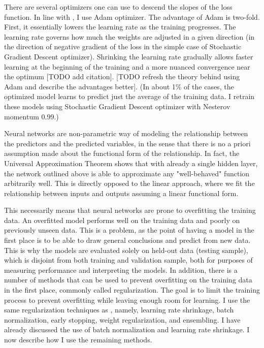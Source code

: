 	There are several optimizers one can use to descend the slopes of the loss function. In line with \cite{gu2020empirical}, I use Adam optimizer. The advantage of Adam is two-fold. First, it essentially lowers the learning rate as the training progresses. The learning rate governs how much the weights are adjusted in a given direction (in the direction of negative gradient of the loss in the simple case of Stochastic Gradient Descent optimizer). Shrinking the learning rate gradually allows faster learning at the beginning of the training and a more nuanced convergence near the optimum [TODO add citation]. [TODO refresh the theory behind using Adam and describe the advantages better]. (In about 1\% of the cases, the optimized model learns to predict just the average of the training data. I retrain these models using Stochastic Gradient Descent optimizer with Nesterov momentum 0.99.)
	
	Neural networks are non-parametric way of modeling the relationship between the predictors and the predicted variables, in the sense that there is no a priori assumption made about the functional form of the relationship. In fact, the Universal Approximation Theorem shows that with already a single hidden layer, the network outlined above is able to approximate any "well-behaved" function arbitrarily well. This is directly opposed to the linear approach, where we fit the relationship between inputs and outputs assuming a linear functional form. 
	
	This necessarily means that neural networks are prone to overfitting the training data. An overfitted model performs well on the training data and poorly on previously unseen data. This is a problem, as the point of having a model in the first place is to be able to draw general conclusions and predict from new data. This is why the models are evaluated solely on held-out data (testing sample), which is disjoint from both training and validation sample, both for purposes of measuring performance and interpreting the models. In addition, there is a number of methods that can be used to prevent overfitting on the training data in the first place, commonly called regularization. The goal is to limit the training process to prevent overfitting while leaving enough room for learning. I use the same regularization techniques as \cite{gu2020empirical}, namely, learning rate shrinkage, batch normalization, early stopping, weight regularization, and ensembling. I have already discussed the use of batch normalization and learning rate shrinkage. I now describe how I use the remaining methods. 
	
